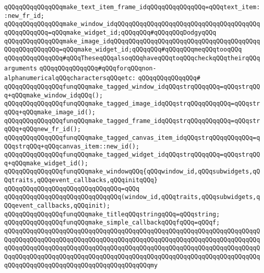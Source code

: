 \verb|qQQqqQQqqQQqqQQqmake_text_item_frame_idqQQqqQQqqQQqqQQq=qQQqtext_item::new_fr_id;|\newline
\verb|qQQqqQQqqQQqqQQqmake_window_idqQQqqQQqqQQqqQQqqQQqqQQqqQQqqQQqqQQqqQQqqQQqqQQqqQQq=qQQqmake_widget_id;qQQqqQQq#qQQqqQQqDodgyqQQq|\newline
\verb|qQQqqQQqqQQqqQQqmake_image_idqQQqqQQqqQQqqQQqqQQqqQQqqQQqqQQqqQQqqQQqqQQqqQQqqQQqqQQq=qQQqmake_widget_id;qQQqqQQq#qQQqqQQqmeqQQqtooqQQq|\newline
\newline
\newline
\verb|qQQqqQQqqQQqqQQq#qQQqTheseqQQqalsoqQQqhaveqQQqtoqQQqcheckqQQqtheirqQQqarguments|\newline
\verb|qQQqqQQqqQQqqQQq#qQQqforqQQqnon-alphanumericalqQQqcharactersqQQqetc:|\newline
\verb|qQQqqQQqqQQqqQQq#|\newline
\verb|qQQqqQQqqQQqqQQqfunqQQqmake_tagged_window_idqQQqstrqQQqqQQq=qQQqstrqQQq+qQQqmake_window_idqQQq();|\newline
\verb|qQQqqQQqqQQqqQQqfunqQQqmake_tagged_image_idqQQqstrqQQqqQQqqQQq=qQQqstrqQQq+qQQqmake_image_id();|\newline
\verb|qQQqqQQqqQQqqQQqfunqQQqmake_tagged_frame_idqQQqstrqQQqqQQqqQQq=qQQqstrqQQq+qQQqnew_fr_id();|\newline
\verb|qQQqqQQqqQQqqQQqfunqQQqmake_tagged_canvas_item_idqQQqstrqQQqqQQqqQQq=qQQqstrqQQq+qQQqcanvas_item::new_id();|\newline
\verb|qQQqqQQqqQQqqQQqfunqQQqmake_tagged_widget_idqQQqstrqQQqqQQq=qQQqstrqQQq+qQQqmake_widget_id();|\newline
\newline
\verb|qQQqqQQqqQQqqQQqfunqQQqmake_windowqQQq{qQQqwindow_id,qQQqsubwidgets,qQQqtraits,qQQqevent_callbacks,qQQqinitqQQq}|\newline
\verb|qQQqqQQqqQQqqQQqqQQqqQQqqQQqqQQq=qQQq|\newline
\verb|qQQqqQQqqQQqqQQqqQQqqQQqqQQqqQQq(window_id,qQQqtraits,qQQqsubwidgets,qQQqevent_callbacks,qQQqinit);|\newline
\newline
\verb|qQQqqQQqqQQqqQQqfunqQQqmake_titleqQQqstringqQQq=qQQqstring;|\newline
\verb|qQQqqQQqqQQqqQQqfunqQQqmake_simple_callbackqQQqfqQQq=qQQqf;|\newline
\verb|qQQqqQQqqQQqqQQqqQQqqQQqqQQqqQQqqQQqqQQqqQQqqQQqqQQqqQQqqQQqqQQqqQQqqQQqqQQqqQQqqQQqqQQqqQQqqQQqqQQqqQQqqQQqqQQqqQQqqQQqqQQqqQQqqQQqqQQqqQQqqQQqqQQqqQQqqQQqqQQqqQQqqQQqqQQqqQQqqQQqqQQqqQQqqQQqqQQqqQQqqQQqqQQqqQQqqQQqqQQqqQQqqQQqqQQqqQQqqQQqqQQqqQQqqQQqqQQqqQQqqQQqqQQqqQQqqQQqqQQqqQQqqQQqqQQqqQQqqQQqqQQqqQQqqQQqqQQqqQQqmy|\newline
